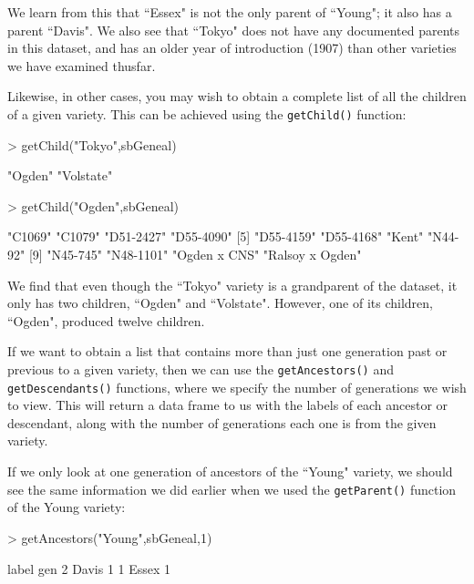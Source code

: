 \documentclass{article}
\numberwithin{equation}{section} %
\begin{document}
We learn from this that ``Essex" is not the only parent of ``Young"; it also has a parent ``Davis". We also see that ``Tokyo" does not have any documented parents in this dataset, and has an older year of introduction (1907) than other varieties we have examined thusfar.

Likewise, in other cases, you may wish to obtain a complete list of all the children of a given variety. This can be achieved using the \texttt{getChild()} function:

\begin{Schunk}
\begin{Sinput}
> getChild("Tokyo",sbGeneal)
\end{Sinput}
\begin{Soutput}
[1] "Ogden"    "Volstate"
\end{Soutput}
\begin{Sinput}
> getChild("Ogden",sbGeneal)
\end{Sinput}
\begin{Soutput}
 [1] "C1069"          "C1079"          "D51-2427"       "D55-4090"      
 [5] "D55-4159"       "D55-4168"       "Kent"           "N44-92"        
 [9] "N45-745"        "N48-1101"       "Ogden x CNS"    "Ralsoy x Ogden"
\end{Soutput}
\end{Schunk}

We find that even though the ``Tokyo" variety is a grandparent of the dataset, it only has two children, ``Ogden" and ``Volstate". However, one of its children, ``Ogden", produced twelve children.

If we want to obtain a list that contains more than just one generation past or previous to a given variety, then we can use the \texttt{getAncestors()} and \texttt{getDescendants()} functions, where we specify the number of generations we wish to view. This will return a data frame to us with the labels of each ancestor or descendant, along with the number of generations each one is from the given variety.

If we only look at one generation of ancestors of the ``Young" variety, we should see the same information we did earlier when we used the \texttt{getParent()} function of the Young variety:

\begin{Schunk}
\begin{Sinput}
> getAncestors("Young",sbGeneal,1)
\end{Sinput}
\begin{Soutput}
  label gen
2 Davis   1
1 Essex   1
\end{Soutput}
\end{Schunk}
\end{document}

